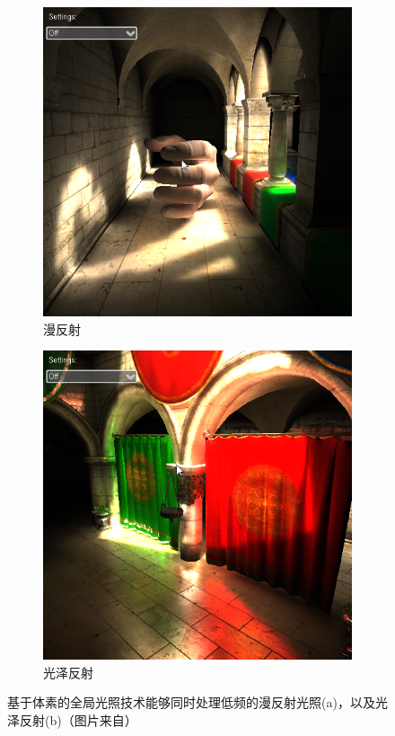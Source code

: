 \begin{figure}
	\begin{subfigure}[b]{0.5\textwidth}
		\includegraphics[width=\textwidth]{figures/vct/vct-14-2}
		\caption{漫反射}
	\end{subfigure}
	\begin{subfigure}[b]{0.5\textwidth}
		\includegraphics[width=\textwidth]{figures/vct/vct-14-3}
		\caption{光泽反射}
	\end{subfigure}
	\caption{基于体素的全局光照技术能够同时处理低频的漫反射光照(a)，以及光泽反射(b)（图片来自\cite{a:InteractiveIndirectIlluminationUsingVoxelConeTracing}）}
	\label{f:vct-diffuse-vs-specular}
\end{figure}

